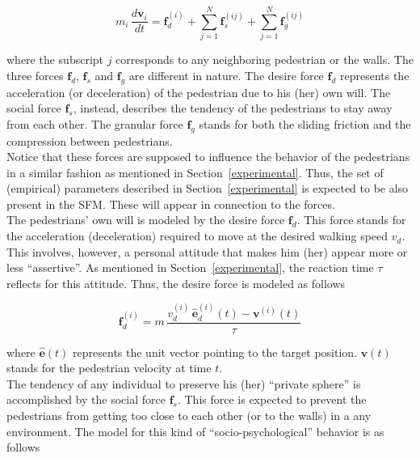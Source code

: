 \documentclass[preprint,12pt]{elsarticle}
\begin{document}
\begin{equation}
 m_i\,\displaystyle\frac{d\mathbf{v}_i}{dt}=\mathbf{f}_d^{(i)}+
 \displaystyle\sum_{j=1}^N\mathbf{f}_s^{(ij)}+
 \displaystyle\sum_{j=1}^N\mathbf{f}_g^{(ij)}\label{eqn_motion}
\end{equation}

\noindent where the subscript $j$ corresponds to any neighboring pedestrian or
the walls. The three forces $\mathbf{f}_d$, $\mathbf{f}_s$ and $\mathbf{f}_g$
are different in nature. The desire force $\mathbf{f}_d$ represents the
acceleration (or deceleration) of the pedestrian due to his (her) own will.  The
social force $\mathbf{f}_s$, instead, describes the tendency of the  pedestrians
to stay away from each other. The granular force $\mathbf{f}_g$  stands for both
the sliding friction and the compression between  pedestrians. \\

Notice that these forces are supposed to influence the behavior of the
pedestrians in a similar fashion as mentioned in Section~\ref{experimental}.
Thus, the set of (empirical) parameters described in Section~\ref{experimental}
is expected to be also present in the SFM. These will appear in connection to
the forces. \\

The pedestrians' own will is modeled by the desire force $\mathbf{f}_d$.  This
force stands for the acceleration (deceleration) required to move  at the
desired walking speed $v_d$. This involves, however, a  personal attitude that
makes him (her) appear more or less ``assertive''. As  mentioned in
Section~\ref{experimental}, the reaction time $\tau$ reflects for  this
attitude. Thus, the desire force is modeled as follows

\begin{equation}
\mathbf{f}_d^{(i)}=m\,\displaystyle\frac{v_d^{(i)}\,
\hat{\mathbf{e}}_d^{(i)}(t)-
 \mathbf{v}^{(i)}(t)}{\tau}
\end{equation}


\noindent where $\hat{\mathbf{e}}(t)$ represents the unit vector pointing to the
target position. $\mathbf{v}(t)$ stands for the pedestrian velocity at time $t$.
\\

The tendency of any individual to preserve his (her) ``private sphere'' is
accomplished by the social force $\mathbf{f}_s$. This force is expected to
prevent the pedestrians from getting too close to each other (or to the walls)
in a any environment. The model for this kind of  ``socio-psychological''
behavior is as follows
\end{document}
